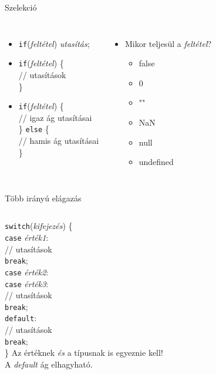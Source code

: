 \documentclass[usenames,dvipsnames,aspectratio=169]{beamer}
\begin{document}
\begin{frame}
    Szelekció
    \begin{columns}[T]
        \begin{itemize}
          \item \texttt{if}(\emph{feltétel}) \emph{utasítás};
          \item \texttt{if}(\emph{feltétel}) \{\\
          \qquad // utasítások \\
          \}
          \item \texttt{if}(\emph{feltétel}) \{ \\
            \qquad // igaz ág utasításai \\
            \} \texttt{else} \{ \\
            \qquad // hamis ág utasításai \\
            \}
        \end{itemize}
        \begin{itemize}
          \item Mikor  teljesül a \emph{feltétel}?
          \begin{itemize}
            \item false
            \item 0
            \item ""
            \item NaN
            \item null
            \item undefined
          \end{itemize}
        \end{itemize}
      \end{columns}
\end{frame}

\begin{frame}
    Több irányú elágazás
    \begin{columns}[T]
        \texttt{switch}(\emph{kifejezés}) \{ \\
        \qquad \texttt{case} \emph{érték1}: \\
        \qquad \qquad // utasítások \\
        \qquad \qquad \texttt{break}; \\
        \qquad \texttt{case} \emph{érték2}: \\
        \qquad \texttt{case} \emph{érték3}: \\
        \qquad \qquad // utasítások \\
        \qquad \qquad \texttt{break}; \\
        \qquad \texttt{default}: \\
        \qquad \qquad // utasítások \\
        \qquad \qquad \texttt{break}; \\
        \}
        Az értéknek \emph{és} a típusnak is egyeznie kell! \\
        A \emph{default} ág elhagyható.
    \end{columns}
\end{frame}
\end{document}
